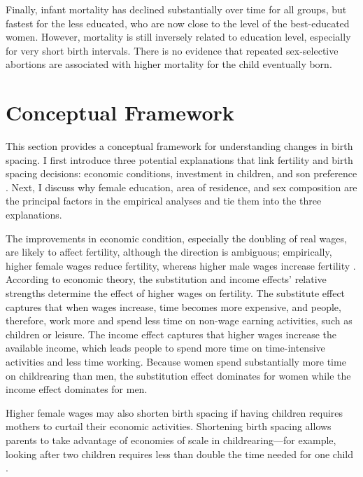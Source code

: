 \documentclass[12pt,letterpaper]{article}
\begin{document}
Finally, infant mortality has declined substantially over time for all groups, but fastest 
for the less educated, who are now close to the level of the best-educated women. 
However, mortality is still inversely related to education level, especially for very short 
birth intervals. 
There is no evidence that repeated sex-selective abortions are associated with higher 
mortality for the child eventually born.


\section{Conceptual Framework}

This section provides a conceptual framework for understanding changes in birth spacing.
I first introduce three potential explanations that link fertility and birth 
spacing decisions: economic conditions, investment in children, and son preference 
\citep{Casterline2016,Portner2018}.
Next, I discuss why female education, area of residence, and sex composition are the
principal factors in the empirical analyses and tie them into the three explanations.

The improvements in economic condition, especially the doubling of real wages,
are likely to affect fertility, although the direction is ambiguous; empirically, 
higher female wages reduce fertility, whereas higher male wages increase fertility 
\citep{Hotz1997,schultz97}.
According to economic theory, the substitution and income effects' relative strengths 
determine the effect of higher wages on fertility.
The substitute effect captures that when wages increase, time becomes more expensive, and
people, therefore, work more and spend less time on non-wage earning activities, such as
children or leisure.
The income effect captures that higher wages increase the available income, which
leads people to spend more time on time-intensive activities and less time working.
Because women spend substantially more time on childrearing than men, the substitution
effect dominates for women while the income effect dominates for men.

Higher female wages may also shorten birth spacing if having children requires mothers to
curtail their economic activities.
Shortening birth spacing allows parents to take advantage of economies of scale in 
childrearing---for example, looking after two children requires less than double the time 
needed for one child \citep{Vijverberg1982,Hotz1997}.
\end{document}
